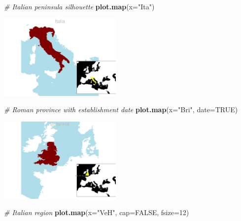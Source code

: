 \documentclass[a4paper,11pt]{memoir}
\newenvironment{Shaded}{\begin{snugshade}}{\end{snugshade}}
\newcommand{\CommentTok}[1]{\textcolor[rgb]{0.56,0.35,0.01}{\textit{#1}}}
\newcommand{\DataTypeTok}[1]{\textcolor[rgb]{0.13,0.29,0.53}{#1}}
\newcommand{\DecValTok}[1]{\textcolor[rgb]{0.00,0.00,0.81}{#1}}
\newcommand{\KeywordTok}[1]{\textcolor[rgb]{0.13,0.29,0.53}{\textbf{#1}}}
\newcommand{\NormalTok}[1]{#1}
\newcommand{\OtherTok}[1]{\textcolor[rgb]{0.56,0.35,0.01}{#1}}
\newcommand{\StringTok}[1]{\textcolor[rgb]{0.31,0.60,0.02}{#1}}
\begin{document}
\begin{Shaded}
\begin{Highlighting}[]
\CommentTok{# Italian peninsula silhouette}
\KeywordTok{plot.map}\NormalTok{(}\DataTypeTok{x=}\StringTok{"Ita"}\NormalTok{)}
\end{Highlighting}
\end{Shaded}

{\centering
\includegraphics[width=6cm, trim=0 0 0 0, clip]{img/unnamed-chunk-5-1_} 
}

\bigbreak
\bigbreak

\begin{Shaded}
\begin{Highlighting}[]
\CommentTok{# Roman province with establishment date}
\KeywordTok{plot.map}\NormalTok{(}\DataTypeTok{x=}\StringTok{"Bri"}\NormalTok{, }\DataTypeTok{date=}\OtherTok{TRUE}\NormalTok{)}
\end{Highlighting}
\end{Shaded}

{\centering
\includegraphics[width=6cm, trim=0 0 0 0, clip]{img/unnamed-chunk-6-1} 
}

\bigbreak
\bigbreak

\begin{Shaded}
\begin{Highlighting}[]
\CommentTok{# Italian region}
\KeywordTok{plot.map}\NormalTok{(}\DataTypeTok{x=}\StringTok{"VeH"}\NormalTok{, }\DataTypeTok{cap=}\OtherTok{FALSE}\NormalTok{, }\DataTypeTok{fsize=}\DecValTok{12}\NormalTok{)}
\end{Highlighting}
\end{Shaded}
\end{document}
